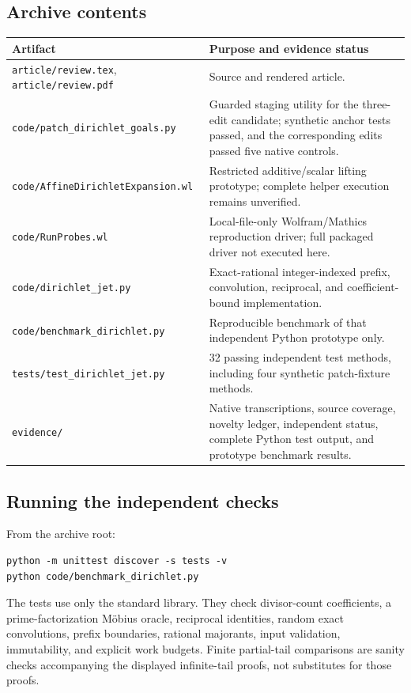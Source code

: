 \documentclass[11pt,letterpaper]{article}
\newcommand{\code}[1]{\nolinkurl{#1}}
\begin{document}
\subsection{Archive contents}
\begin{longtable}{@{}P{0.46\textwidth}P{0.47\textwidth}@{}}
\toprule
Artifact & Purpose and evidence status\\\midrule\endhead
\code{article/review.tex}, \code{article/review.pdf} & Source and rendered article.\\
\code{code/patch_dirichlet_goals.py} & Guarded staging utility for the three-edit candidate; synthetic anchor tests passed, and the corresponding edits passed five native controls.\\
\code{code/AffineDirichletExpansion.wl} & Restricted additive/scalar lifting prototype; complete helper execution remains unverified.\\
\code{code/RunProbes.wl} & Local-file-only Wolfram/Mathics reproduction driver; full packaged driver not executed here.\\
\code{code/dirichlet_jet.py} & Exact-rational integer-indexed prefix, convolution, reciprocal, and coefficient-bound implementation.\\
\code{code/benchmark_dirichlet.py} & Reproducible benchmark of that independent Python prototype only.\\
\code{tests/test_dirichlet_jet.py} & 32 passing independent test methods, including four synthetic patch-fixture methods.\\
\code{evidence/} & Native transcriptions, source coverage, novelty ledger, independent status, complete Python test output, and prototype benchmark results.\\
\bottomrule
\end{longtable}

\subsection{Running the independent checks}
From the archive root:
\begin{lstlisting}
python -m unittest discover -s tests -v
python code/benchmark_dirichlet.py
\end{lstlisting}
The tests use only the standard library. They check divisor-count coefficients,
a prime-factorization M\"obius oracle, reciprocal identities, random exact
convolutions, prefix boundaries, rational majorants, input validation,
immutability, and explicit work budgets. Finite partial-tail comparisons are
sanity checks accompanying the displayed infinite-tail proofs, not substitutes
for those proofs.
\end{document}
